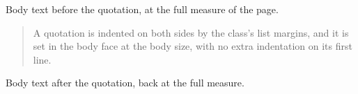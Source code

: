 \documentclass{article}
\begin{document}
Body text before the quotation, at the full measure of the page.

\begin{quote}
A quotation is indented on both sides by the class's list margins, and it is
set in the body face at the body size, with no extra indentation on its first
line.
\end{quote}

Body text after the quotation, back at the full measure.
\end{document}
